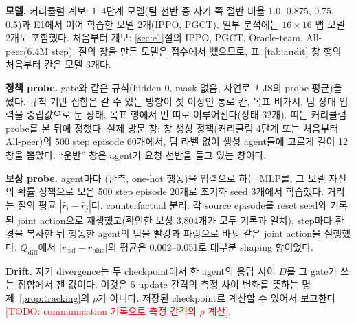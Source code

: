 \documentclass[twocolumn,10pt]{article}
\theoremstyle{remark}
\newcommand{\todo}[1]{\textcolor{red}{[TODO: #1]}}
\newcommand{\ours}{PGCT}
\begin{document}
\textbf{모델.} 커리큘럼 계보: 1--4단계 모델(팀 선반 중 자기 쪽 절반 비율 1.0, 0.875, 0.75, 0.5)과 E1에서 이어 학습한 모델
2개(IPPO, \ours{}). 일부 분석에는 $16\times16$ 맵 모델 2개도 포함했다. 처음부터 계보: \ref{sec:e1}절의 IPPO, \ours{}, Oracle-team,
All-peer(6.4M step). 질의 창을 만든 모델은 점수에서 뺐으므로, 표~\ref{tab:audit} 창 행의 처음부터 칸은 모델 3개다.

\textbf{정책 probe.} gate와 같은 규칙(hidden 0, mask 없음, 자연로그 JS의 probe 평균)을 썼다. 규칙 기반 집합은 갈 수 있는 방향이
셋 이상인 통로 칸, 목표 비가시, 팀 상대 입력을 중립값으로 둔 상태, 목표 행에서 먼 띠로 이루어진다(상태 32개). 띠는 커리큘럼 probe를
본 뒤에 정했다. 실제 방문 창: 창 생성 정책(커리큘럼 4단계 또는 처음부터 All-peer)의 500 step episode 60개에서, 팀 라벨 없이 생성
agent들에 고르게 길이 12 창을 뽑았다. ``운반'' 창은 agent가 요청 선반을 들고 있는 창이다.

\textbf{보상 probe.} agent마다 (관측, one-hot 행동)을 입력으로 하는 MLP를, 그 모델 자신의 확률 정책으로 모은 500 step episode 20개로
초기화 seed 3개에서 학습했다. 거리는 질의 평균 $|\hat r_i-\hat r_j|$다. counterfactual 분리: 각 source episode를 reset seed와 기록된
joint action으로 재생했고(확인한 보상 3{,}804개가 모두 기록과 일치), step마다 환경을 복사한 뒤 행동한 agent의 팀을 빨강과 파랑으로
바꿔 같은 joint action을 실행했다. $Q_{\mathrm{diff}}$에서 $|r_{\mathrm{red}}-r_{\mathrm{blue}}|$의 평균은 0.002--0.051로 대부분
shaping 항이었다.

\textbf{Drift.} 자기 divergence는 두 checkpoint에서 한 agent의 응답 사이 $D$를 그 gate가 쓰는 집합에서 잰 값이다. 이것은 5 update
간격의 측정 사이 변화를 뜻하는 명제~\ref{prop:tracking}의 $\rho$가 아니다. 저장된 checkpoint로 계산할 수 있어서 보고한다
\todo{communication 기록으로 측정 간격의 $\rho$ 계산}.
\end{document}
